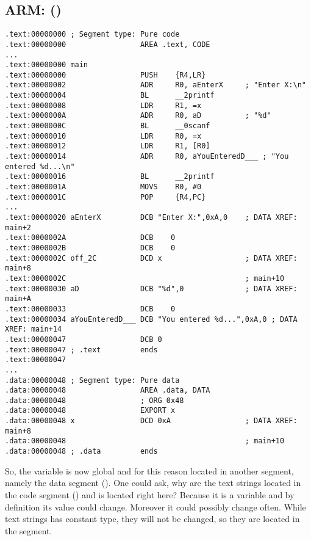 \subsection{ARM: \OptimizingKeilVI (\ThumbMode)}

\begin{lstlisting}
.text:00000000 ; Segment type: Pure code
.text:00000000                 AREA .text, CODE
...
.text:00000000 main
.text:00000000                 PUSH    {R4,LR}
.text:00000002                 ADR     R0, aEnterX     ; "Enter X:\n"
.text:00000004                 BL      __2printf
.text:00000008                 LDR     R1, =x
.text:0000000A                 ADR     R0, aD          ; "%d"
.text:0000000C                 BL      __0scanf
.text:00000010                 LDR     R0, =x
.text:00000012                 LDR     R1, [R0]
.text:00000014                 ADR     R0, aYouEnteredD___ ; "You entered %d...\n"
.text:00000016                 BL      __2printf
.text:0000001A                 MOVS    R0, #0
.text:0000001C                 POP     {R4,PC}
...
.text:00000020 aEnterX         DCB "Enter X:",0xA,0    ; DATA XREF: main+2
.text:0000002A                 DCB    0
.text:0000002B                 DCB    0
.text:0000002C off_2C          DCD x                   ; DATA XREF: main+8
.text:0000002C                                         ; main+10
.text:00000030 aD              DCB "%d",0              ; DATA XREF: main+A
.text:00000033                 DCB    0
.text:00000034 aYouEnteredD___ DCB "You entered %d...",0xA,0 ; DATA XREF: main+14
.text:00000047                 DCB 0
.text:00000047 ; .text         ends
.text:00000047
...
.data:00000048 ; Segment type: Pure data
.data:00000048                 AREA .data, DATA
.data:00000048                 ; ORG 0x48
.data:00000048                 EXPORT x
.data:00000048 x               DCD 0xA                 ; DATA XREF: main+8
.data:00000048                                         ; main+10
.data:00000048 ; .data         ends
\end{lstlisting}

So, the  variable is now global and for this reason located in another segment, namely the data segment ().
One could ask, why are the text strings located in the code segment () and  is located right here?
Because it is a variable and by definition its value could change. Moreover it could possibly change often.
While text strings has constant type, they will not be changed, so they are located in the  segment.
\myindex{\RAM}
\myindex{\ROM}

